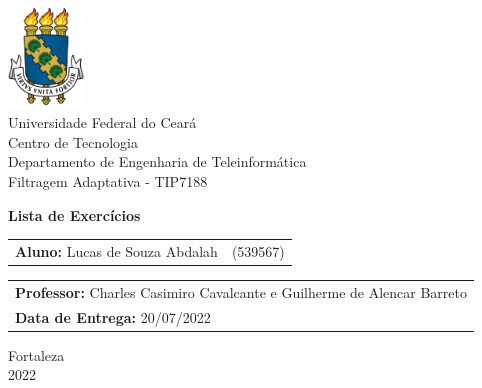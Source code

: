 \begin{titlepage}

\begin{center}
    \includegraphics[width=2cm]{adj/brasao.png}\\
    {\large {Universidade Federal do Ceará}}\\
    {\large {Centro de Tecnologia}}\\
    {\large {Departamento de Engenharia de Teleinformática}}\\
    {\large {Filtragem Adaptativa - TIP7188}}
\end{center}

\vspace{180pt}

\begin{center}
    {\large \textbf {Lista de Exercícios}}
\end{center}

\vspace*{\fill}

\begin{table}[h]
\begin{tabular}{ll}
    \textbf{Aluno:} Lucas de Souza Abdalah & (539567) \\
\end{tabular}
\end{table}

\begin{table}[h]
\begin{tabular}{l}
    \textbf{Professor:} Charles Casimiro Cavalcante e Guilherme de Alencar Barreto \\
    \textbf{Data de Entrega:} 20/07/2022
\end{tabular}
\end{table}

\vspace{\fill}

\begin{center}
    Fortaleza\\
    2022
\end{center}

\end{titlepage}


\tableofcontents
\thispagestyle{empty}
\clearpage